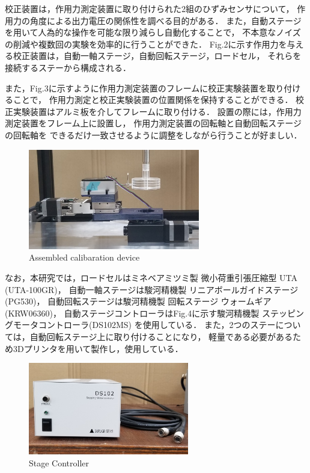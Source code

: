 \newpage

校正装置は，作用力測定装置に取り付けられた2組のひずみセンサについて，
作用力の角度による出力電圧の関係性を調べる目的がある．
また，自動ステージを用いて人為的な操作を可能な限り減らし自動化することで，
不本意なノイズの削減や複数回の実験を効率的に行うことができた．
Fig.2に示す作用力を与える校正装置は，自動一軸ステージ，自動回転ステージ，ロードセル，
それらを接続するステーから構成される．

また，Fig.3に示すように作用力測定装置のフレームに校正実験装置を取り付けることで，
作用力測定と校正実験装置の位置関係を保持することができる．
校正実験装置はアルミ板を介してフレームに取り付ける．
設置の際には，作用力測定装置をフレーム上に設置し，
作用力測定装置の回転軸と自動回転ステージの回転軸を
できるだけ一致させるように調整をしながら行うことが好ましい．
\begin{figure}[htbp]
    \footnotesize
    \begin{center}
        \includegraphics[width=75mm]{images/22-3.png}
        \caption{Assembled calibaration device}
    \end{center}
\end{figure}

なお，本研究では，ロードセルはミネベアミツミ製 微小荷重引張圧縮型 UTA (UTA-100GR)，
自動一軸ステージは駿河精機製 リニアボールガイドステージ (PG530)，
自動回転ステージは駿河精機製 回転ステージ ウォームギア (KRW06360)，
自動ステージコントローラはFig.4に示す駿河精機製 ステッピングモータコントローラ(DS102MS) を使用している．
また，2つのステーについては，自動回転ステージ上に取り付けることになり，
軽量である必要があるため3Dプリンタを用いて製作し，使用している．

\begin{figure}[htbp]
    \footnotesize
    \begin{center}
        \includegraphics[width=70mm]{images/22-4.png}
        \caption{Stage Controller}
    \end{center}
\end{figure}

